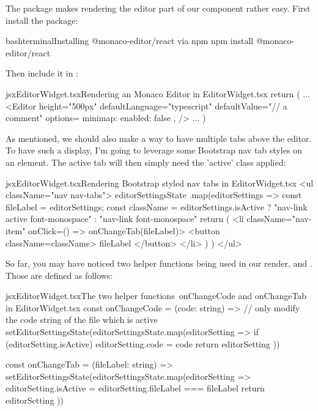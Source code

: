 \documentclass[paper=6in:9in,pagesize=pdftex,headinclude=on,footinclude=on,12pt,twoside]{scrbook}
\begin{document}

The  package makes rendering the editor part of our component rather easy. First install the package:

\begin{codeInput}{bash}{terminal}{Installing @monaco-editor/react via npm}
npm install @monaco-editor/react
\end{codeInput}

Then include it in :

\begin{codeInput}{jsx}{EditorWidget.tsx}{Rendering an Monaco Editor in EditorWidget.tsx}
return (
  ...
  <Editor
    height="500px"
    defaultLanguage="typescript"
    defaultValue={"// a comment"}
    options={{
      minimap: { enabled: false },
    }}
  />
  ...
)
\end{codeInput}

As mentioned, we should also make a way to have multiple tabs above the editor. To have such a display, I'm going to leverage some Bootstrap nav tab styles on an  element. The active tab will then simply need the 'active' class applied:

\begin{codeInput}{jsx}{EditorWidget.tsx}{Rendering Bootstrap styled nav tabs in EditorWidget.tsx}
  <ul className="nav nav-tabs">
  {editorSettingsState
    .map(editorSettings => {
      const { fileLabel } = editorSettings;
      const className =
      editorSettings.isActive
          ? "nav-link active font-monospace"
          : "nav-link font-monospace"
      return (
        <li className="nav-item" onClick={() => onChangeTab(fileLabel)}>
          <button className={className}>
            {fileLabel}
          </button>
        </li>
      )
    })}
</ul>
\end{codeInput}

So far, you may have noticed two helper functions being used in our render,  and . Those are defined as follows:

\begin{codeInput}{jsx}{EditorWidget.tsx}{The two helper functions\, onChangeCode and onChangeTab in EditorWidget.tsx}
const onChangeCode = (code: string) => {
  // only modify the code string of the file which is active
  setEditorSettingsState(editorSettingsState.map(editorSetting => {
    if (editorSetting.isActive) {
      editorSetting.code = code
    }
    return editorSetting
  }))
}

const onChangeTab = (fileLabel: string) => {
  setEditorSettingsState(editorSettingsState.map(editorSetting => {
      editorSetting.isActive = editorSetting.fileLabel === fileLabel
    return editorSetting
  }))
}
\end{codeInput}
\end{document}
